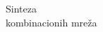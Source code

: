 \begin{frame}[label=02-s001]
\centering
{\LARGE\color{DEplava}Sinteza\\[3mm]kombinacionih mreža}
\end{frame}
